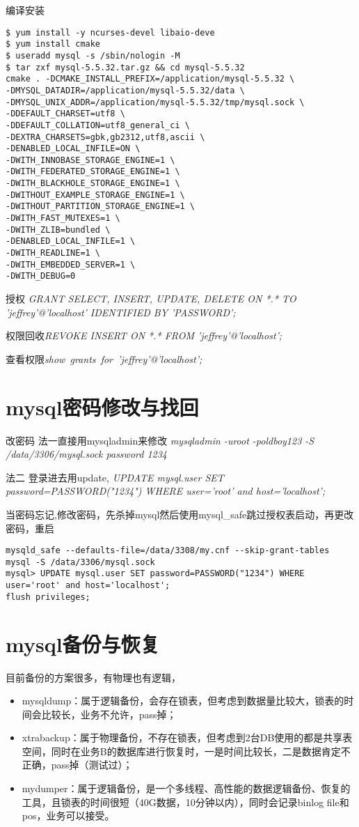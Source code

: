 编译安装
\begin{lstlisting}
$ yum install -y ncurses-devel libaio-deve
$ yum install cmake
$ useradd mysql -s /sbin/nologin -M
$ tar zxf mysql-5.5.32.tar.gz && cd mysql-5.5.32
cmake . -DCMAKE_INSTALL_PREFIX=/application/mysql-5.5.32 \
-DMYSQL_DATADIR=/application/mysql-5.5.32/data \
-DMYSQL_UNIX_ADDR=/application/mysql-5.5.32/tmp/mysql.sock \
-DDEFAULT_CHARSET=utf8 \
-DDEFAULT_COLLATION=utf8_general_ci \
-DEXTRA_CHARSETS=gbk,gb2312,utf8,ascii \
-DENABLED_LOCAL_INFILE=ON \
-DWITH_INNOBASE_STORAGE_ENGINE=1 \
-DWITH_FEDERATED_STORAGE_ENGINE=1 \
-DWITH_BLACKHOLE_STORAGE_ENGINE=1 \
-DWITHOUT_EXAMPLE_STORAGE_ENGINE=1 \
-DWITHOUT_PARTITION_STORAGE_ENGINE=1 \
-DWITH_FAST_MUTEXES=1 \
-DWITH_ZLIB=bundled \
-DENABLED_LOCAL_INFILE=1 \
-DWITH_READLINE=1 \
-DWITH_EMBEDDED_SERVER=1 \
-DWITH_DEBUG=0
\end{lstlisting}

授权
\textit{GRANT SELECT, INSERT, UPDATE, DELETE ON *.* TO 'jeffrey'@'localhost' IDENTIFIED BY 'PASSWORD';}

权限回收\textit{REVOKE INSERT ON *.* FROM 'jeffrey'@'localhost';}

查看权限\textit{show grants for 'jeffrey'@'localhost';}

\section{mysql密码修改与找回}
改密码
法一直接用mysqladmin来修改\textit{ mysqladmin -uroot -poldboy123 -S /data/3306/mysql.sock password 1234}

法二 登录进去用update, \textit{ UPDATE mysql.user SET password=PASSWORD("1234") WHERE user='root' and host='localhost';}

当密码忘记,修改密码，先杀掉mysql然后使用mysql_safe跳过授权表启动，再更改密码，重启
\begin{lstlisting}
mysqld_safe --defaults-file=/data/3308/my.cnf --skip-grant-tables
mysql -S /data/3306/mysql.sock
mysql> UPDATE mysql.user SET password=PASSWORD("1234") WHERE user='root' and host='localhost';
flush privileges;
\end{lstlisting}

\section{mysql备份与恢复}
目前备份的方案很多，有物理也有逻辑，
\begin{itemize}
\item mysqldump：属于逻辑备份，会存在锁表，但考虑到数据量比较大，锁表的时间会比较长，业务不允许，pass掉；
\item xtrabackup：属于物理备份，不存在锁表，但考虑到2台DB使用的都是共享表空间，同时在业务B的数据库进行恢复时，一是时间比较长，二是数据肯定不正确，pass掉（测试过）；
\item mydumper：属于逻辑备份，是一个多线程、高性能的数据逻辑备份、恢复的工具，且锁表的时间很短（40G数据，10分钟以内），同时会记录binlog file和pos，业务可以接受。
\end{itemize}

